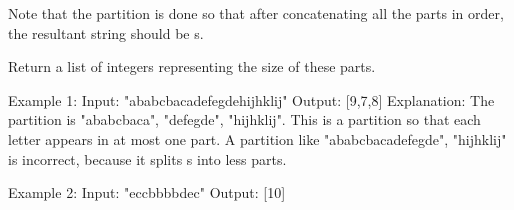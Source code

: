 \begin{enumerate}
Note that the partition is done so that after concatenating all the parts in order, the resultant string should be s.

Return a list of integers representing the size of these parts. 

\begin{consolethree}
Example 1:
Input: "ababcbacadefegdehijhklij"
Output: [9,7,8]
Explanation:
The partition is "ababcbaca", "defegde", "hijhklij".
This is a partition so that each letter appears in at most one part.
A partition like "ababcbacadefegde", "hijhklij" is incorrect, because it splits s into less parts.

Example 2:
Input: "eccbbbbdec"
Output: [10]
\end{consolethree}
\newpage

\end{enumerate}
